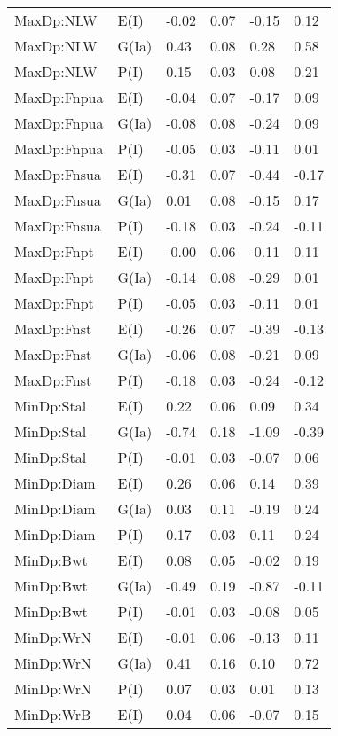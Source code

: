 \begin{center}
\begin{longtable}{|p{1.1in}|p{0.7in}|p{0.7in}|p{0.6in}|p{0.6in}|p{0.6in}|}
  MaxDp:NLW & E(I) & -0.02 & 0.07 & -0.15 & 0.12 \\ 
  MaxDp:NLW & G(Ia) & 0.43 & 0.08 & 0.28 & 0.58 \\ 
  MaxDp:NLW & P(I) & 0.15 & 0.03 & 0.08 & 0.21 \\ 
  MaxDp:Fnpua & E(I) & -0.04 & 0.07 & -0.17 & 0.09 \\ 
  MaxDp:Fnpua & G(Ia) & -0.08 & 0.08 & -0.24 & 0.09 \\ 
  MaxDp:Fnpua & P(I) & -0.05 & 0.03 & -0.11 & 0.01 \\ 
  MaxDp:Fnsua & E(I) & -0.31 & 0.07 & -0.44 & -0.17 \\ 
  MaxDp:Fnsua & G(Ia) & 0.01 & 0.08 & -0.15 & 0.17 \\ 
  MaxDp:Fnsua & P(I) & -0.18 & 0.03 & -0.24 & -0.11 \\ 
  MaxDp:Fnpt & E(I) & -0.00 & 0.06 & -0.11 & 0.11 \\ 
  MaxDp:Fnpt & G(Ia) & -0.14 & 0.08 & -0.29 & 0.01 \\ 
  MaxDp:Fnpt & P(I) & -0.05 & 0.03 & -0.11 & 0.01 \\ 
  MaxDp:Fnst & E(I) & -0.26 & 0.07 & -0.39 & -0.13 \\ 
  MaxDp:Fnst & G(Ia) & -0.06 & 0.08 & -0.21 & 0.09 \\ 
  MaxDp:Fnst & P(I) & -0.18 & 0.03 & -0.24 & -0.12 \\ 
  MinDp:Stal & E(I) & 0.22 & 0.06 & 0.09 & 0.34 \\ 
  MinDp:Stal & G(Ia) & -0.74 & 0.18 & -1.09 & -0.39 \\ 
  MinDp:Stal & P(I) & -0.01 & 0.03 & -0.07 & 0.06 \\ 
  MinDp:Diam & E(I) & 0.26 & 0.06 & 0.14 & 0.39 \\ 
  MinDp:Diam & G(Ia) & 0.03 & 0.11 & -0.19 & 0.24 \\ 
  MinDp:Diam & P(I) & 0.17 & 0.03 & 0.11 & 0.24 \\ 
  MinDp:Bwt & E(I) & 0.08 & 0.05 & -0.02 & 0.19 \\ 
  MinDp:Bwt & G(Ia) & -0.49 & 0.19 & -0.87 & -0.11 \\ 
  MinDp:Bwt & P(I) & -0.01 & 0.03 & -0.08 & 0.05 \\ 
  MinDp:WrN & E(I) & -0.01 & 0.06 & -0.13 & 0.11 \\ 
  MinDp:WrN & G(Ia) & 0.41 & 0.16 & 0.10 & 0.72 \\ 
  MinDp:WrN & P(I) & 0.07 & 0.03 & 0.01 & 0.13 \\ 
  MinDp:WrB & E(I) & 0.04 & 0.06 & -0.07 & 0.15 \\ 

\end{longtable}
\end{center}
